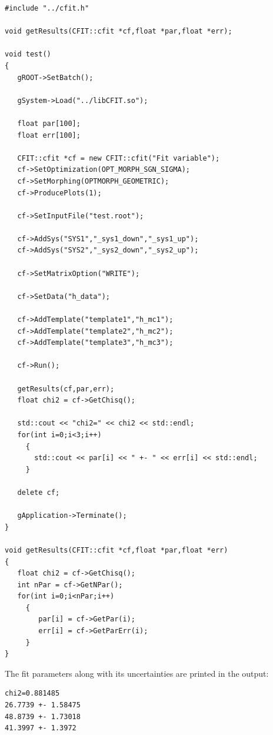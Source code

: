 \documentclass[12pt]{article}
\begin{document}
\begin{verbatim}
#include "../cfit.h"

void getResults(CFIT::cfit *cf,float *par,float *err);

void test()
{
   gROOT->SetBatch();
   
   gSystem->Load("../libCFIT.so");

   float par[100];
   float err[100];
   
   CFIT::cfit *cf = new CFIT::cfit("Fit variable");
   cf->SetOptimization(OPT_MORPH_SGN_SIGMA);
   cf->SetMorphing(OPTMORPH_GEOMETRIC);
   cf->ProducePlots(1);
   
   cf->SetInputFile("test.root");

   cf->AddSys("SYS1","_sys1_down","_sys1_up");
   cf->AddSys("SYS2","_sys2_down","_sys2_up");

   cf->SetMatrixOption("WRITE");
   
   cf->SetData("h_data");
   
   cf->AddTemplate("template1","h_mc1");
   cf->AddTemplate("template2","h_mc2");
   cf->AddTemplate("template3","h_mc3");

   cf->Run();
   
   getResults(cf,par,err);
   float chi2 = cf->GetChisq();
   
   std::cout << "chi2=" << chi2 << std::endl;
   for(int i=0;i<3;i++)
     {
       std::cout << par[i] << " +- " << err[i] << std::endl;
     }   

   delete cf;
   
   gApplication->Terminate();
}

void getResults(CFIT::cfit *cf,float *par,float *err)
{   
   float chi2 = cf->GetChisq();
   int nPar = cf->GetNPar();
   for(int i=0;i<nPar;i++)
     {
        par[i] = cf->GetPar(i);
        err[i] = cf->GetParErr(i);	
     }
}
\end{verbatim}

The fit parameters along with its uncertainties are printed in the
output:

\begin{verbatim}
chi2=0.881485
26.7739 +- 1.58475
48.8739 +- 1.73018
41.3997 +- 1.3972
\end{verbatim}

\FloatBarrier
\end{document}

